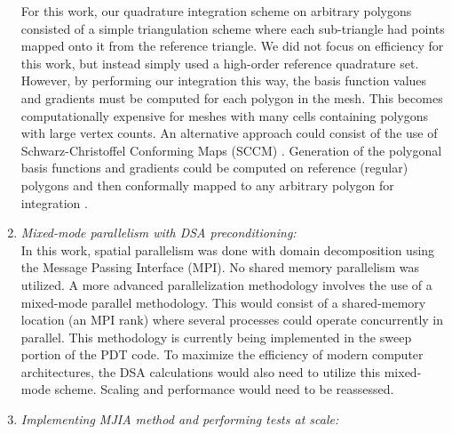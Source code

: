\begin{enumerate}
For this work, our quadrature integration scheme on arbitrary polygons consisted of a simple triangulation scheme where each sub-triangle had points mapped onto it from the reference triangle. We did not focus on efficiency for this work, but instead simply used a high-order reference quadrature set. However, by performing our integration this way, the basis function values and gradients must be computed for each polygon in the mesh. This becomes computationally expensive for meshes with many cells containing polygons with large vertex counts. An alternative approach could consist of the use of Schwarz-Christoffel Conforming Maps (SCCM) \cite{driscoll2002schwarz,driscoll2005algorithm}. Generation of the polygonal basis functions and gradients could be computed on reference (regular) polygons and then conformally mapped to any arbitrary polygon for integration \cite{natarajan2009numerical}.
\item {\em Mixed-mode parallelism with DSA preconditioning:} \\
In this work, spatial parallelism was done with domain decomposition using the Message Passing Interface (MPI). No shared memory parallelism was utilized. A more advanced parallelization methodology involves the use of a mixed-mode parallel methodology. This would consist of a shared-memory location (an MPI rank) where several processes could operate concurrently in parallel. This methodology is currently being implemented in the sweep portion of the PDT code. To maximize the efficiency of modern computer architectures, the DSA calculations would also need to utilize this mixed-mode scheme. Scaling and performance would need to be reassessed.
\item {\em Implementing MJIA method and performing tests at scale:} \\

\end{enumerate}